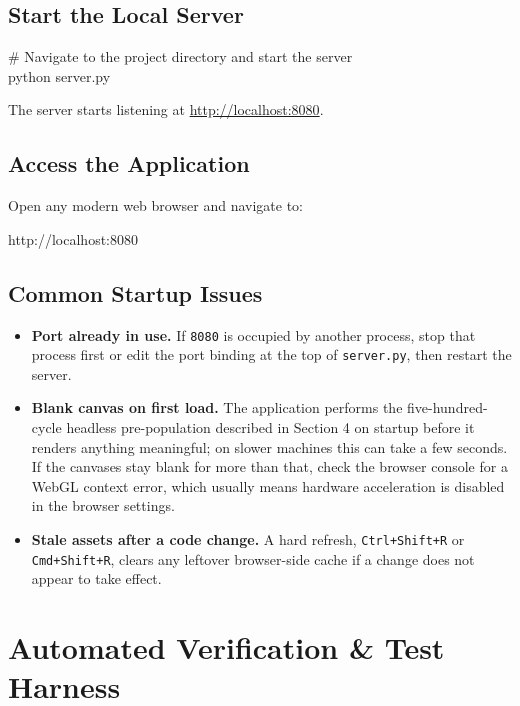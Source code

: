 \documentclass[11pt]{article}
\begin{document}
\subsection{Start the Local Server}
\begin{tcolorbox}[colback=lightbg,colframe=sylasgray,arc=1mm,fontupper=\ttfamily\small]
\# Navigate to the project directory and start the server\\
python server.py
\end{tcolorbox}
The server starts listening at \url{http://localhost:8080}.

\subsection{Access the Application}
Open any modern web browser and navigate to:
\begin{tcolorbox}[colback=lightbg,colframe=sylasgray,arc=1mm,fontupper=\ttfamily\small]
http://localhost:8080
\end{tcolorbox}

\subsection{Common Startup Issues}

\begin{itemize}[leftmargin=1.2cm]
    \item \textbf{Port already in use.} If \texttt{8080} is occupied by another process, stop that process first or edit the port binding at the top of \texttt{server.py}, then restart the server.
    \item \textbf{Blank canvas on first load.} The application performs the five-hundred-cycle headless pre-population described in Section 4 on startup before it renders anything meaningful; on slower machines this can take a few seconds. If the canvases stay blank for more than that, check the browser console for a WebGL context error, which usually means hardware acceleration is disabled in the browser settings.
    \item \textbf{Stale assets after a code change.} A hard refresh, \texttt{Ctrl+Shift+R} or \texttt{Cmd+Shift+R}, clears any leftover browser-side cache if a change does not appear to take effect.
\end{itemize}

\section{Automated Verification \& Test Harness}
\end{document}
